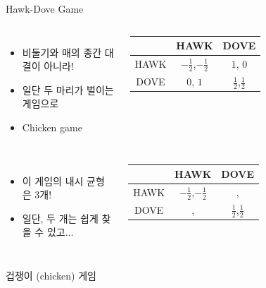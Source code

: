 \documentclass[final]{beamer}
\begin{document}
\begin{frame}[t]{Hawk-Dove Game}
	\begin{columns}[c]
		\column{16em}
		\begin{itemize}
			\item 비둘기와 매의 종간 대결이 아니라! 
			\item 일단 두 마리가 벌이는 게임으로
			\item Chicken game  
		\end{itemize}
		\column{14em}
		\setlength{\tabcolsep}{0.9em}
		\begin{tabular}{|c|c|c|} \hline
			& {HAWK} &  {DOVE}\\ \hline
			{HAWK} & {\large $-\frac{1}{2}$},{\large $-\frac{1}{2}$} & {$1$}, {$0$} \\ \hline%
			 {DOVE} & $0$, $1$  & {\large $\frac{1}{2}$},{\large $\frac{1}{2}$} \\ 
			\hline
		\end{tabular}
	\end{columns}
	\pause\vspace{1em}
	\begin{columns}[c]
		\column{16em}
		\begin{itemize}
			\item 이 게임의 내시 균형은 3개!
			\item 일단, 두 개는 쉽게 찾을 수 있고... 
		\end{itemize}
		\column{14em}
		\setlength{\tabcolsep}{0.9em}
		\begin{tabular}{|c|c|c|} \hline
			& {HAWK} &  {DOVE}\\ \hline
			{HAWK} & {\large $-\frac{1}{2}$},{\large $-\frac{1}{2}$} & \color{red}{$\mathbf 1$}, \color{red}{$\mathbf 0$} \\ \hline%
			 {DOVE} & \color{red}{$\mathbf 0$}, \color{red}{$\mathbf 1$}  & {\large $\frac{1}{2}$},{\large $\frac{1}{2}$} \\ 
			\hline
		\end{tabular}
	\end{columns}
\end{frame}

\begin{frame}[t]{겁쟁이 (chicken) 게임}
	\begin{center}
	\end{center}
\end{frame}
\end{document}

